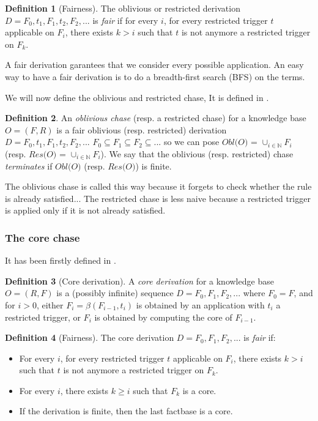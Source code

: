 \documentclass{article}
\theoremstyle{definition}
\newtheorem{definition}{Definition}[section]
\theoremstyle{remark}
\def \N {\mathbb N}
\begin{document}
\begin{definition}[Fairness]
The oblivious or restricted derivation $D=F_0,t_1,F_1,t_2,F_2,...$ is \emph{fair} if for every $i$, for every restricted trigger $t$ applicable on $F_i$, there exists $k > i$ such that $t$ is not anymore a restricted trigger on $F_k$.
\end{definition}

A fair derivation garantees that we consider every possible application. An easy way to have a fair derivation is to do a breadth-first search (BFS) on the terms.



We will now define the oblivious and restricted chase, It is defined in \cite{obl_res}.


\begin{definition}
An \emph{oblivious chase} (resp. a restricted chase) for a knowledge base $O= (F,R)$ is a fair oblivious (resp. restricted) derivation $D=F_0,t_1,F_1,t_2,F_2,...$ $F_0 \subseteq F_1 \subseteq F_2 \subseteq ...$ so we can pose \emph{$\textit{Obl(O)}$} = $\cup_{i \in \N}F_i$ (resp. \emph{$\textit{Res(O)}$} = $\cup_{i \in \N}F_i$).
We say that the oblivious (resp. restricted) chase \emph{terminates} if $\textit{Obl(O)}$ (resp. $\textit{Res(O)}$) is finite.
\end{definition}


The oblivious chase is called this way because it forgets to check whether the rule is already satisfied... The restricted chase is less naive because a restricted trigger is applied only if it is not already satisfied.


\subsubsection{The core chase}

It has been firstly defined in \cite{core_chase}.

\begin{definition}[Core derivation]
A \emph{core derivation} for a knowledge base $O = (R,F)$ is a (possibly infinite) sequence $D = F_0, F_1, F_2, ...$ where $F_0 = F$, and for $i >0$, either $F_{i}= \beta(F_{i-1},t_i)$ is obtained by an application with $t_i$ a restricted trigger, or $F_i$ is obtained by computing the core of $F_{i-1}$. 
\end{definition} 

\begin{definition}[Fairness]
The core derivation $D=F_0,F_1,F_2,...$ is \emph{fair} if:
\begin{itemize}
\item For every $i$, for every restricted trigger $t$ applicable on $F_i$, there exists $k > i$ such that $t$ is not anymore a restricted trigger on $F_k$.
\item For every $i$, there exists $k \geq i$ such that $F_k$ is a core.
\item If the derivation is finite, then the last factbase is a core.
\end{itemize}
\end{definition}
\end{document}

